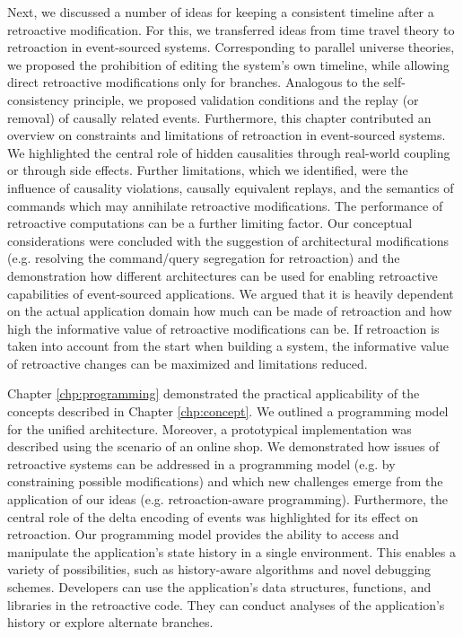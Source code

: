 Next, we discussed a number of ideas for keeping a consistent timeline after a 
retroactive modification. For this, we transferred ideas from time travel theory 
to retroaction in event-sourced systems. Corresponding to parallel universe 
theories, we proposed the prohibition of editing the system's own timeline, while 
allowing direct retroactive modifications only for branches.
Analogous to the self-consistency principle, we proposed validation conditions 
and the replay (or removal) of causally related events. 
%
Furthermore, this chapter contributed an overview on constraints and limitations 
of retroaction in event-sourced systems. We highlighted the central role of 
hidden causalities through real-world coupling or through side effects. 
Further limitations, which we identified, were the influence of causality 
violations, causally equivalent replays, and the semantics of commands which 
may annihilate retroactive modifications. The performance of retroactive 
computations can be a further limiting factor.
%
Our conceptual considerations were concluded with the suggestion of architectural 
modifications (e.g. resolving the command/query segregation for retroaction) and 
the demonstration how different architectures can be used for enabling retroactive 
capabilities of event-sourced applications.
%
We argued that it is heavily dependent on the actual application domain how much 
can be made of retroaction and how high the informative value of retroactive 
modifications can be.
If retroaction is taken into account from the start when building a system, the 
informative value of retroactive changes can be maximized and limitations reduced.

Chapter \ref{chp:programming} demonstrated the practical applicability of the 
concepts described in Chapter \ref{chp:concept}. We outlined a programming model 
for the unified architecture. Moreover, a prototypical implementation was 
described using the scenario of an online shop. 
We demonstrated how issues of retroactive systems can be addressed in a
programming model (e.g. by constraining possible modifications) and which new 
challenges emerge from the application of our ideas (e.g. retroaction-aware 
programming). Furthermore, the central role of the delta encoding of events was 
highlighted for its effect on retroaction.
%
Our programming model provides the ability to access and manipulate the application's 
state history in a single environment. This enables a variety of possibilities, 
such as history-aware algorithms and novel debugging schemes.
Developers can use the application's data structures, functions, and libraries 
in the retroactive code. They can conduct analyses of the application's history
or explore alternate branches.

